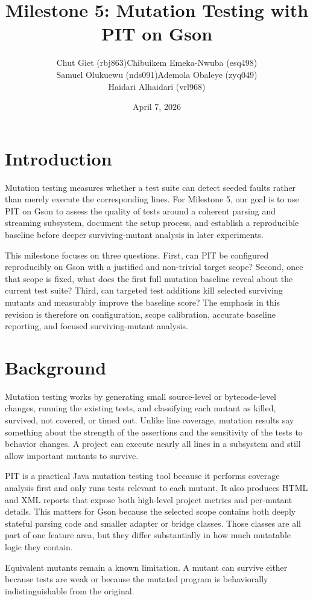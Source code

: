 \documentclass[11pt]{article}
\title{Milestone 5: Mutation Testing with PIT on Gson}
\author{%
\begin{tabular}{cc}
Chut Giet (rbj863) & Chibuikem Emeka-Nwuba (esq498) \\
Samuel Olukuewu (nds091) & Ademola Obaleye (zyq049) \\
\multicolumn{2}{c}{Haidari Alhaidari (vrl968)}
\end{tabular}%
}
\date{April 7, 2026}
\begin{document}
\maketitle


\section{Introduction}
Mutation testing measures whether a test suite can detect seeded faults rather than merely execute the corresponding lines. For Milestone 5, our goal is to use PIT on Gson to assess the quality of tests around a coherent parsing and streaming subsystem, document the setup process, and establish a reproducible baseline before deeper surviving-mutant analysis in later experiments.

This milestone focuses on three questions. First, can PIT be configured reproducibly on Gson with a justified and non-trivial target scope? Second, once that scope is fixed, what does the first full mutation baseline reveal about the current test suite? Third, can targeted test additions kill selected surviving mutants and measurably improve the baseline score? The emphasis in this revision is therefore on configuration, scope calibration, accurate baseline reporting, and focused surviving-mutant analysis.

\section{Background}
Mutation testing works by generating small source-level or bytecode-level changes, running the existing tests, and classifying each mutant as killed, survived, not covered, or timed out. Unlike line coverage, mutation results say something about the strength of the assertions and the sensitivity of the tests to behavior changes. A project can execute nearly all lines in a subsystem and still allow important mutants to survive.

PIT is a practical Java mutation testing tool because it performs coverage analysis first and only runs tests relevant to each mutant. It also produces HTML and XML reports that expose both high-level project metrics and per-mutant details. This matters for Gson because the selected scope contains both deeply stateful parsing code and smaller adapter or bridge classes. Those classes are all part of one feature area, but they differ substantially in how much mutatable logic they contain.

Equivalent mutants remain a known limitation. A mutant can survive either because tests are weak or because the mutated program is behaviorally indistinguishable from the original. 
\end{document}
